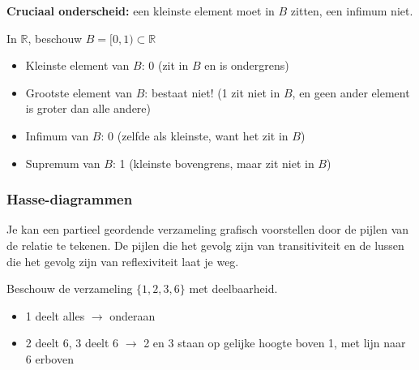 \begin{barbox}[red!66][red!1]
     \textbf{Cruciaal onderscheid:} een kleinste element moet in $B$ zitten, een infimum niet.
\end{barbox}

\textbf{} In $\mathbb{R}$, beschouw $B = [0,1) \subset \mathbb{R}$
\begin{itemize}
    \item Kleinste element van $B$: 0 (zit in $B$ en is ondergrens)
    \item Grootste element van $B$: bestaat niet! (1 zit niet in $B$, en geen ander element is groter dan alle andere)
    \item Infimum van $B$: 0 (zelfde als kleinste, want het zit in $B$)
    \item Supremum van $B$: 1 (kleinste bovengrens, maar zit niet in $B$)
\end{itemize}

\subsubsection{Hasse-diagrammen}

Je kan een partieel geordende verzameling grafisch voorstellen door de pijlen van de relatie te tekenen. De pijlen die het gevolg zijn van transitiviteit en de lussen die het gevolg zijn van reflexiviteit laat je weg. 

\textbf{} Beschouw de verzameling $\{1,2,3,6\}$ met deelbaarheid. 

\noindent
\begin{minipage}[t]{0.55\textwidth}
\vspace{0pt} %
\begin{itemize}
    \item 1 deelt alles $\to$ onderaan
    \item 2 deelt 6, 3 deelt 6 $\to$ 2 en 3 staan op gelijke hoogte boven 1, met lijn naar 6 erboven
\end{itemize}
\end{minipage}%
\hfill
\begin{minipage}[t]{0.35\textwidth}
\vspace{0pt} %
\begin{center}
\resizebox{0.65\textwidth}{!}{%
    
}
\end{center}
\end{minipage}

